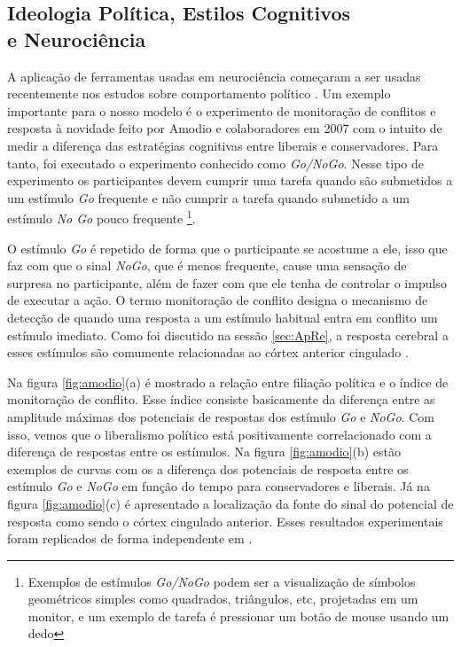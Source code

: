 \subsection{Ideologia Política, Estilos Cognitivos \\e Neurociência} %
\label{subsec:neuropol}

A aplicação de ferramentas usadas em neurociência começaram a ser usadas
recentemente nos estudos sobre comportamento político . Um
exemplo importante para o nosso modelo é o experimento de monitoração de
conflitos e resposta à novidade feito por Amodio e colaboradores em 2007
 com o intuito de medir a diferença das estratégias
cognitivas entre liberais e conservadores. Para tanto, foi executado o
experimento conhecido como \textit{Go/NoGo}. Nesse tipo de experimento
os participantes devem cumprir uma tarefa quando são submetidos a um
estímulo \textit{Go} frequente e não cumprir a tarefa quando submetido a
um estímulo \textit{No Go} pouco frequente \footnote{Exemplos de estímulos
\textit{Go/NoGo} podem ser a visualização de símbolos geométricos simples
como quadrados, triângulos, etc, projetadas em um monitor, e um exemplo de
tarefa é pressionar um botão de mouse usando um dedo}.

O estímulo \textit{Go} é repetido de forma que o participante se acostume
a ele, isso que faz com que o sinal \textit{NoGo}, que é menos frequente,
cause uma sensação de surpresa no participante, além de fazer com que ele
tenha de controlar o impulso de executar a ação.  O termo monitoração
de conflito designa o mecanismo de detecção de  quando uma resposta a
um estímulo habitual entra em conflito um estímulo imediato. Como foi
discutido na sessão \ref{sec:ApRe}, a resposta cerebral a esses estímulos
são comumente relacionadas ao córtex anterior cingulado \citep{Yeung2004}.

Na figura \ref{fig:amodio}(a) é mostrado a relação entre filiação
política e o índice de monitoração de conflito. Esse índice consiste
basicamente da diferença entre as amplitude máximas dos potenciais de
respostas dos estímulo \textit{Go} e \textit{NoGo}. Com isso, vemos que o
liberalismo político está positivamente correlacionado com a diferença
de respostas entre os estímulos. Na figura \ref{fig:amodio}(b) estão
exemplos de curvas com os a diferença dos potenciais de resposta entre os
estímulo \textit{Go} e \textit{NoGo} em função do tempo para conservadores
e liberais. Já na figura \ref{fig:amodio}(c) é apresentado a localização
da fonte do sinal do potencial de resposta como sendo o córtex cingulado
anterior. Esses resultados experimentais foram replicados de forma independente
em \citep{Weissflog2010}.


